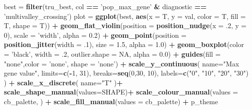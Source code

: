 \documentclass[]{book}
\newenvironment{Shaded}{\begin{snugshade}}{\end{snugshade}}
\newcommand{\DataTypeTok}[1]{\textcolor[rgb]{0.13,0.29,0.53}{#1}}
\newcommand{\DecValTok}[1]{\textcolor[rgb]{0.00,0.00,0.81}{#1}}
\newcommand{\FloatTok}[1]{\textcolor[rgb]{0.00,0.00,0.81}{#1}}
\newcommand{\KeywordTok}[1]{\textcolor[rgb]{0.13,0.29,0.53}{\textbf{#1}}}
\newcommand{\NormalTok}[1]{#1}
\newcommand{\OperatorTok}[1]{\textcolor[rgb]{0.81,0.36,0.00}{\textbf{#1}}}
\newcommand{\OtherTok}[1]{\textcolor[rgb]{0.56,0.35,0.01}{#1}}
\newcommand{\StringTok}[1]{\textcolor[rgb]{0.31,0.60,0.02}{#1}}
\begin{document}
\begin{Shaded}
\begin{Highlighting}[]
\NormalTok{best =}\StringTok{ }\KeywordTok{filter}\NormalTok{(tru_best, col }\OperatorTok{==}\StringTok{ 'pop_max_gene'} \OperatorTok{&}\StringTok{ }\NormalTok{diagnostic }\OperatorTok{==}\StringTok{ 'multivalley_crossing'}\NormalTok{)}
\NormalTok{plot =}\StringTok{  }\KeywordTok{ggplot}\NormalTok{(best, }\KeywordTok{aes}\NormalTok{(}\DataTypeTok{x =}\NormalTok{ T, }\DataTypeTok{y =}\NormalTok{ val, }\DataTypeTok{color =}\NormalTok{ T, }\DataTypeTok{fill =}\NormalTok{ T, }\DataTypeTok{shape =}\NormalTok{ T)) }\OperatorTok{+}
\StringTok{          }\KeywordTok{geom_flat_violin}\NormalTok{(}\DataTypeTok{position =} \KeywordTok{position_nudge}\NormalTok{(}\DataTypeTok{x =} \FloatTok{.2}\NormalTok{, }\DataTypeTok{y =} \DecValTok{0}\NormalTok{), }\DataTypeTok{scale =} \StringTok{'width'}\NormalTok{, }\DataTypeTok{alpha =} \FloatTok{0.2}\NormalTok{) }\OperatorTok{+}
\StringTok{          }\KeywordTok{geom_point}\NormalTok{(}\DataTypeTok{position =} \KeywordTok{position_jitter}\NormalTok{(}\DataTypeTok{width =} \FloatTok{.1}\NormalTok{), }\DataTypeTok{size =} \FloatTok{1.5}\NormalTok{, }\DataTypeTok{alpha =} \FloatTok{1.0}\NormalTok{) }\OperatorTok{+}
\StringTok{          }\KeywordTok{geom_boxplot}\NormalTok{(}\DataTypeTok{color =} \StringTok{'black'}\NormalTok{, }\DataTypeTok{width =} \FloatTok{.2}\NormalTok{, }\DataTypeTok{outlier.shape =} \OtherTok{NA}\NormalTok{, }\DataTypeTok{alpha =} \FloatTok{0.0}\NormalTok{) }\OperatorTok{+}
\StringTok{          }\KeywordTok{guides}\NormalTok{(}\DataTypeTok{fill =} \StringTok{"none"}\NormalTok{,}\DataTypeTok{color =} \StringTok{'none'}\NormalTok{, }\DataTypeTok{shape =} \StringTok{'none'}\NormalTok{) }\OperatorTok{+}
\StringTok{          }\KeywordTok{scale_y_continuous}\NormalTok{(}
            \DataTypeTok{name=}\StringTok{"Max gene value"}\NormalTok{,}
            \DataTypeTok{limits=}\KeywordTok{c}\NormalTok{(}\OperatorTok{-}\DecValTok{1}\NormalTok{, }\DecValTok{31}\NormalTok{),}
            \DataTypeTok{breaks=}\KeywordTok{seq}\NormalTok{(}\DecValTok{0}\NormalTok{,}\DecValTok{30}\NormalTok{, }\DecValTok{10}\NormalTok{),}
            \DataTypeTok{labels=}\KeywordTok{c}\NormalTok{(}\StringTok{"0"}\NormalTok{, }\StringTok{"10"}\NormalTok{, }\StringTok{"20"}\NormalTok{, }\StringTok{"30"}\NormalTok{)}
\NormalTok{          ) }\OperatorTok{+}
\StringTok{          }\KeywordTok{scale_x_discrete}\NormalTok{(}
            \DataTypeTok{name=}\StringTok{"T"}
\NormalTok{          )}\OperatorTok{+}
\StringTok{          }\KeywordTok{scale_shape_manual}\NormalTok{(}\DataTypeTok{values=}\NormalTok{SHAPE)}\OperatorTok{+}
\StringTok{          }\KeywordTok{scale_colour_manual}\NormalTok{(}\DataTypeTok{values =}\NormalTok{ cb_palette, ) }\OperatorTok{+}
\StringTok{          }\KeywordTok{scale_fill_manual}\NormalTok{(}\DataTypeTok{values =}\NormalTok{ cb_palette) }\OperatorTok{+}
\StringTok{          }\NormalTok{p_theme}


\end{Highlighting}
\end{Shaded}
\end{document}
